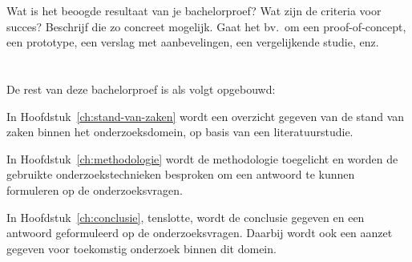 Wat is het beoogde resultaat van je bachelorproef? Wat zijn de criteria voor succes? Beschrijf die zo concreet mogelijk. 
Gaat het bv.\ om een proof-of-concept, een prototype, een verslag met aanbevelingen, een vergelijkende studie, enz.

\section{}%
\label{sec:opzet-bachelorproef}


De rest van deze bachelorproef is als volgt opgebouwd:

In Hoofdstuk~\ref{ch:stand-van-zaken} wordt een overzicht gegeven van de stand van zaken binnen het onderzoeksdomein, op basis van een literatuurstudie.

In Hoofdstuk~\ref{ch:methodologie} wordt de methodologie toegelicht en worden de gebruikte onderzoekstechnieken besproken om een antwoord te kunnen formuleren op de onderzoeksvragen.


In Hoofdstuk~\ref{ch:conclusie}, tenslotte, wordt de conclusie gegeven en een antwoord geformuleerd op de onderzoeksvragen. Daarbij wordt ook een aanzet gegeven voor toekomstig onderzoek binnen dit domein.